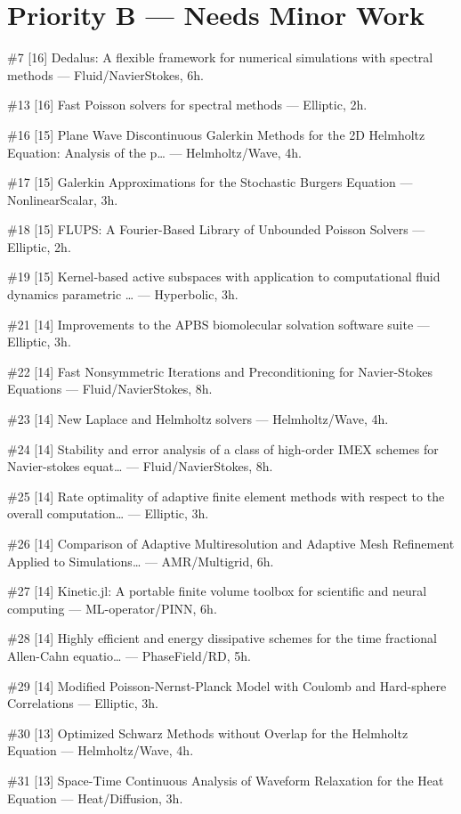 \documentclass[10pt,letterpaper]{article}
\begin{document}
\section{Priority B — Needs Minor Work}

\#7 [16] Dedalus: A flexible framework for numerical simulations with spectral methods — Fluid/NavierStokes, 6h.

\#13 [16] Fast Poisson solvers for spectral methods — Elliptic, 2h.

\#16 [15] Plane Wave Discontinuous Galerkin Methods for the 2D Helmholtz Equation: Analysis of the p… — Helmholtz/Wave, 4h.

\#17 [15] Galerkin Approximations for the Stochastic Burgers Equation — NonlinearScalar, 3h.

\#18 [15] FLUPS: A Fourier-Based Library of Unbounded Poisson Solvers — Elliptic, 2h.

\#19 [15] Kernel‐based active subspaces with application to computational fluid dynamics parametric … — Hyperbolic, 3h.

\#21 [14] Improvements to the APBS biomolecular solvation software suite — Elliptic, 3h.

\#22 [14] Fast Nonsymmetric Iterations and Preconditioning for Navier-Stokes Equations — Fluid/NavierStokes, 8h.

\#23 [14] New Laplace and Helmholtz solvers — Helmholtz/Wave, 4h.

\#24 [14] Stability and error analysis of a class of high-order IMEX schemes for Navier-stokes equat… — Fluid/NavierStokes, 8h.

\#25 [14] Rate optimality of adaptive finite element methods with respect to the overall computation… — Elliptic, 3h.

\#26 [14] Comparison of Adaptive Multiresolution and Adaptive Mesh Refinement Applied to Simulations… — AMR/Multigrid, 6h.

\#27 [14] Kinetic.jl: A portable finite volume toolbox for scientific and neural computing — ML-operator/PINN, 6h.

\#28 [14] Highly efficient and energy dissipative schemes for the time fractional Allen-Cahn equatio… — PhaseField/RD, 5h.

\#29 [14] Modified Poisson-Nernst-Planck Model with Coulomb and Hard-sphere Correlations — Elliptic, 3h.

\#30 [13] Optimized Schwarz Methods without Overlap for the Helmholtz Equation — Helmholtz/Wave, 4h.

\#31 [13] Space-Time Continuous Analysis of Waveform Relaxation for the Heat Equation — Heat/Diffusion, 3h.
\end{document}
